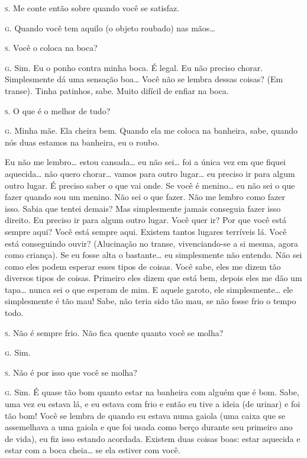 \noindent\hskip0mm\textsc{s.} Me conte então sobre quando você se satisfaz.

\noindent\hskip0mm\textsc{g.} Quando você tem aquilo (o objeto roubado) nas mãos\ldots{}

\noindent\hskip0mm\textsc{s.} Você o coloca na boca?

\noindent\hskip0mm\textsc{g.} Sim. Eu o ponho contra minha boca. É legal. Eu não preciso chorar.
Simplesmente dá uma sensação boa\ldots{} Você não se lembra dessas coisas?
(Em transe). Tinha patinhos, sabe. Muito difícil de enfiar na boca.

\noindent\hskip0mm\textsc{s.} O que é o melhor de tudo?

\noindent\hskip0mm\textsc{g.} Minha mãe. Ela cheira bem. Quando ela me coloca na banheira, sabe,
quando nós duas estamos na banheira, eu o roubo.

Eu não me lembro\ldots{} estou cansada\ldots{} eu não sei\ldots{} foi a única vez
em que fiquei aquecida\ldots{} não quero chorar\ldots{} vamos para outro lugar\ldots{}
eu preciso ir para algum outro lugar. É preciso saber o que vai onde.
Se você é menino\ldots{} eu não sei o que fazer quando sou um menino. Não
sei o que fazer. Não me lembro como fazer isso. Sabia que tentei
demais? Mas simplesmente jamais conseguia fazer isso direito. Eu
preciso ir para algum outro lugar. Você quer ir? Por que você está
sempre aqui? Você está sempre aqui. Existem tantos lugares terríveis
lá. Você está conseguindo ouvir? (Alucinação\idxaluci{} no transe, vivenciando-se
a si mesma, agora como criança). Se eu fosse alta o bastante\ldots{} eu
simplesmente não entendo. Não sei como eles podem esperar esses tipos
de coisas. Você sabe, eles me dizem tão diversos tipos de coisas.
Primeiro eles dizem que está bem, depois eles me dão um tapa\ldots{} nunca
sei o que esperam de mim. E aquele garoto, ele simplesmente\ldots{} ele
simplesmente é tão mau! Sabe, não teria sido tão mau, se não fosse frio
o tempo todo.

\noindent\hskip0mm\textsc{s.} Não é sempre frio. Não fica quente quanto você se molha?

\noindent\hskip0mm\textsc{g.} Sim.

\noindent\hskip0mm\textsc{s.} Não é por isso que você se molha?

\noindent\hskip0mm\textsc{g.} Sim. É quase tão bom quanto estar na banheira com alguém que é bom.
Sabe, uma vez eu estava lá, e eu estava com frio e então eu tive a
ideia (de urinar) e foi tão bom! Você se lembra de quando eu estava
numa gaiola (uma caixa que se assemelhava a uma gaiola e que foi usada
como berço durante seu primeiro ano de vida), eu fiz isso estando
acordada. Existem duas coisas boas: estar aquecida e estar com a boca
cheia\ldots{} se ela estiver com você.

